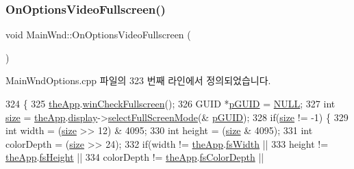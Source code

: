 \subsubsection{\texorpdfstring{On\+Options\+Video\+Fullscreen()}{OnOptionsVideoFullscreen()}}
{\footnotesize\ttfamily void Main\+Wnd\+::\+On\+Options\+Video\+Fullscreen (\begin{DoxyParamCaption}{ }\end{DoxyParamCaption})\hspace{0.3cm}{\ttfamily [protected]}}



Main\+Wnd\+Options.\+cpp 파일의 323 번째 라인에서 정의되었습니다.


\begin{DoxyCode}
324 \{
325   \mbox{\hyperlink{_v_b_a_8cpp_a8095a9d06b37a7efe3723f3218ad8fb3}{theApp}}.\mbox{\hyperlink{class_v_b_a_a340eaeeb7fcfc242f08ac3442d991a96}{winCheckFullscreen}}();        
326   GUID *\mbox{\hyperlink{_video_mode_8cpp_a53702c538e287c41ffc68a11699623ce}{pGUID}} = \mbox{\hyperlink{getopt1_8c_a070d2ce7b6bb7e5c05602aa8c308d0c4}{NULL}};
327   \textcolor{keywordtype}{int} \mbox{\hyperlink{expr-lex_8cpp_ab7d671599a7b25ca99a487fa341bc33a}{size}} = \mbox{\hyperlink{_v_b_a_8cpp_a8095a9d06b37a7efe3723f3218ad8fb3}{theApp}}.\mbox{\hyperlink{class_v_b_a_a940e5bad8b3ed2436888dbcd03bfd563}{display}}->\mbox{\hyperlink{class_i_display_a2f7a55f63c5e4b24245aa88228afab68}{selectFullScreenMode}}(&
      \mbox{\hyperlink{_video_mode_8cpp_a53702c538e287c41ffc68a11699623ce}{pGUID}});
328   \textcolor{keywordflow}{if}(\mbox{\hyperlink{expr-lex_8cpp_ab7d671599a7b25ca99a487fa341bc33a}{size}} != -1) \{
329     \textcolor{keywordtype}{int} width = (\mbox{\hyperlink{expr-lex_8cpp_ab7d671599a7b25ca99a487fa341bc33a}{size}} >> 12) & 4095;
330     \textcolor{keywordtype}{int} height = (\mbox{\hyperlink{expr-lex_8cpp_ab7d671599a7b25ca99a487fa341bc33a}{size}} & 4095);
331     \textcolor{keywordtype}{int} colorDepth = (\mbox{\hyperlink{expr-lex_8cpp_ab7d671599a7b25ca99a487fa341bc33a}{size}} >> 24);
332     \textcolor{keywordflow}{if}(width != \mbox{\hyperlink{_v_b_a_8cpp_a8095a9d06b37a7efe3723f3218ad8fb3}{theApp}}.\mbox{\hyperlink{class_v_b_a_a92ef1c149914189da4d110d6dada54bb}{fsWidth}} ||
333        height != \mbox{\hyperlink{_v_b_a_8cpp_a8095a9d06b37a7efe3723f3218ad8fb3}{theApp}}.\mbox{\hyperlink{class_v_b_a_a1e59d9254f1cb6420502c537c35dd5ec}{fsHeight}} ||
334        colorDepth != \mbox{\hyperlink{_v_b_a_8cpp_a8095a9d06b37a7efe3723f3218ad8fb3}{theApp}}.\mbox{\hyperlink{class_v_b_a_a1baf02b3f4ad129bfd713f1a132e96b9}{fsColorDepth}} ||

\end{DoxyCode}
